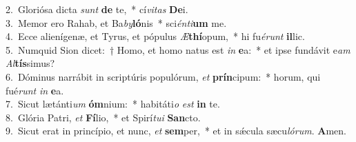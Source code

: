 {2.~}Gloriósa dicta \textit{sunt} \textbf{de} te,~* cí\textit{vi}\textit{tas} \textbf{De}i.\\
{3.~}Memor ero Rahab, et Ba\textit{by}\textbf{ló}nis~* sci\textit{én}\textit{ti}\textbf{um} me.\\
{4.~}Ecce alienígenæ, et Tyrus, et pópulus \textit{Æ}\textbf{thí}opum,~* hi fu\textit{é}\textit{runt} \textbf{il}lic.\\
{5.~}Numquid Sion dicet:~† Homo, et homo natus est \textit{in} \textbf{e}a:~* et ipse fundávit e\textit{am} \textit{Al}\textbf{tís}simus?\\
{6.~}Dóminus narrábit in scriptúris populórum, \textit{et} \textbf{prín}cipum:~* horum, qui fué\textit{runt} \textit{in} \textbf{e}a.\\
{7.~}Sicut lætánti\textit{um} \textbf{óm}nium:~* habitáti\textit{o} \textit{est} \textbf{in} te.\\
{8.~}Glória Patri, \textit{et} \textbf{Fí}lio,~* et Spirí\textit{tu}\textit{i} \textbf{San}cto.\\
{9.~}Sicut erat in princípio, et nunc, \textit{et} \textbf{sem}per,~* et in sǽcula sæcu\textit{ló}\textit{rum}. \textbf{A}men.\\
